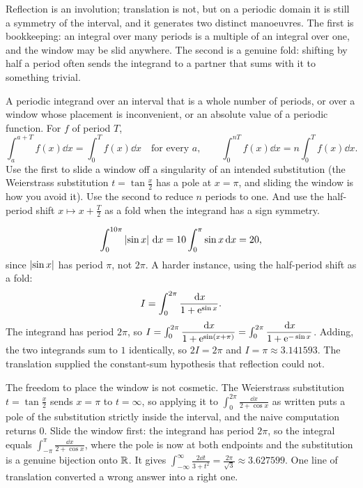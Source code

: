 Reflection is an involution; translation is not, but on a periodic domain it is still a symmetry of the interval, and it generates two distinct manoeuvres. The first is bookkeeping: an integral over many periods is a multiple of an integral over one, and the window may be slid anywhere. The second is a genuine fold: shifting by half a period often sends the integrand to a partner that sums with it to something trivial.

\cue A periodic integrand over an interval that is a whole number of periods, or over a window whose placement is inconvenient, or an absolute value of a periodic function.
\method For $f$ of period $T$,
\[\int_a^{a+T}f(x)\dd x=\int_0^{T}f(x)\dd x\quad\text{for every }a,\qquad \int_0^{nT}f(x)\dd x=n\int_0^{T}f(x)\dd x.\]
Use the first to slide a window off a singularity of an intended substitution (the Weierstrass substitution $t=\tan\tfrac x2$ has a pole at $x=\pi$, and sliding the window is how you avoid it). Use the second to reduce $n$ periods to one. And use the half-period shift $x\mapsto x+\tfrac{T}{2}$ as a fold when the integrand has a sign symmetry.

\begin{worked}
\[\int_0^{10\pi}\left\lvert \sin x\right\rvert\,\mathrm{d} x=10\int_0^{\pi}\sin x\,\mathrm{d} x=20,\]
since $\left\lvert \sin x\right\rvert$ has period $\pi$, not $2\pi$. A harder instance, using the half-period shift as a fold:
\[I=\int_0^{2\pi}\frac{\,\mathrm{d} x}{1+\mathrm{e}^{\sin x}}.\]
The integrand has period $2\pi$, so $I=\int_0^{2\pi}\dfrac{\,\mathrm{d} x}{1+\mathrm{e}^{\sin(x+\pi)}}=\int_0^{2\pi}\dfrac{\,\mathrm{d} x}{1+\mathrm{e}^{-\sin x}}$. Adding, the two integrands sum to $1$ identically, so $2I=2\pi$ and $I=\pi\approx3.141593$. The translation supplied the constant-sum hypothesis that reflection could not.
\end{worked}

\begin{keynote}
The freedom to place the window is not cosmetic. The Weierstrass substitution $t=\tan\tfrac x2$ sends $x=\pi$ to $t=\infty$, so applying it to $\displaystyle\int_0^{2\pi}\frac{\dd x}{2+\cos x}$ as written puts a pole of the substitution strictly inside the interval, and the naive computation returns $0$. Slide the window first: the integrand has period $2\pi$, so the integral equals $\displaystyle\int_{-\pi}^{\pi}\frac{\dd x}{2+\cos x}$, where the pole is now at both endpoints and the substitution is a genuine bijection onto $\mathbb{R}$. It gives $\displaystyle\int_{-\infty}^{\infty}\frac{2\dd t}{3+t^{2}}=\frac{2\pi}{\sqrt3}\approx3.627599$. One line of translation converted a wrong answer into a right one.
\end{keynote}

